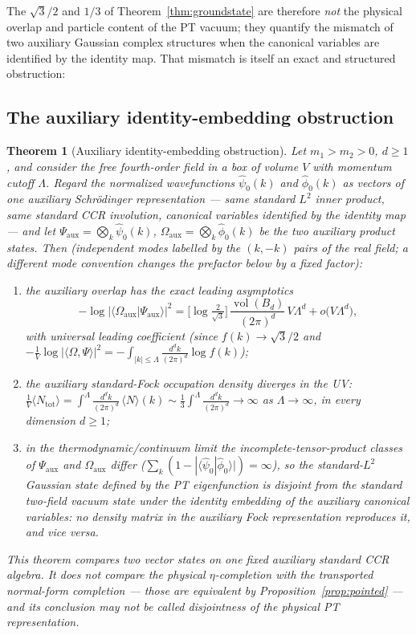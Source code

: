 \documentclass[11pt]{article}
\newtheorem{theorem}{Theorem}[section]
\theoremstyle{definition}
\theoremstyle{remark}
\begin{document}
The $\sqrt3/2$ and $1/3$ of Theorem~\ref{thm:groundstate} are therefore
\emph{not} the physical overlap and particle content of the PT vacuum;
they quantify the mismatch of two auxiliary Gaussian complex structures
when the canonical variables are identified by the identity map.  That
mismatch is itself an exact and structured obstruction:

\subsection{The auxiliary identity-embedding obstruction}

\begin{theorem}[Auxiliary identity-embedding obstruction]
\label{thm:disjoint}
Let $m_1>m_2>0$, $d\ge1$, and consider the free fourth-order field in a
box of volume $V$ with momentum cutoff $\Lambda$.  Regard the normalized
wavefunctions $\hat\psi_0(k)$ and $\hat\phi_0(k)$ as vectors of one
auxiliary Schr\"odinger representation --- same standard $L^2$ inner
product, same standard CCR involution, canonical variables identified by
the identity map --- and let
$\Psi_{\mathrm{aux}}=\bigotimes_k\hat\psi_0(k)$,
$\Omega_{\mathrm{aux}}=\bigotimes_k\hat\phi_0(k)$ be the two auxiliary
product states.  Then (independent modes labelled by the $(k,-k)$ pairs
of the real field; a different mode convention changes the prefactor
below by a fixed factor):
\begin{enumerate}
\item the auxiliary overlap has the exact leading asymptotics
\begin{equation}
-\log\big|\langle\Omega_{\mathrm{aux}}|\Psi_{\mathrm{aux}}\rangle\big|^2
=\Big[\log\tfrac{2}{\sqrt3}\Big]\,
\frac{\operatorname{vol}(B_d)}{(2\pi)^d}\,V\Lambda^d
+o\big(V\Lambda^d\big),
\end{equation}
with universal leading coefficient (since $f(k)\to\sqrt3/2$ and
$-\tfrac1V\log|\langle\Omega,\Psi\rangle|^2
=-\int_{|k|\le\Lambda}\tfrac{d^dk}{(2\pi)^d}\log f(k)$);
\item the auxiliary standard-Fock occupation density diverges in the UV:
$\frac1V\langle N_{\mathrm{tot}}\rangle
=\int^{\Lambda}\!\frac{d^dk}{(2\pi)^d}\,\langle N\rangle(k)
\sim\frac13\int^{\Lambda}\!\frac{d^dk}{(2\pi)^d}\to\infty$ as
$\Lambda\to\infty$, in \emph{every} dimension $d\ge1$;
\item in the thermodynamic/continuum limit the incomplete-tensor-product
classes of $\Psi_{\mathrm{aux}}$ and $\Omega_{\mathrm{aux}}$ differ
($\sum_k(1-|\langle\hat\psi_0|\hat\phi_0\rangle|)=\infty$), so the
standard-$L^2$ Gaussian state defined by the PT eigenfunction is
disjoint from the standard two-field vacuum state \emph{under the
identity embedding of the auxiliary canonical variables}: no density
matrix in the auxiliary Fock representation reproduces it, and vice
versa.
\end{enumerate}
This theorem compares two vector states on one fixed auxiliary standard
CCR algebra.  It does \emph{not} compare the physical $\eta$-completion
with the transported normal-form completion --- those are equivalent by
Proposition~\ref{prop:pointed} --- and its conclusion may not be called
disjointness of the physical PT representation.
\end{theorem}
\end{document}
